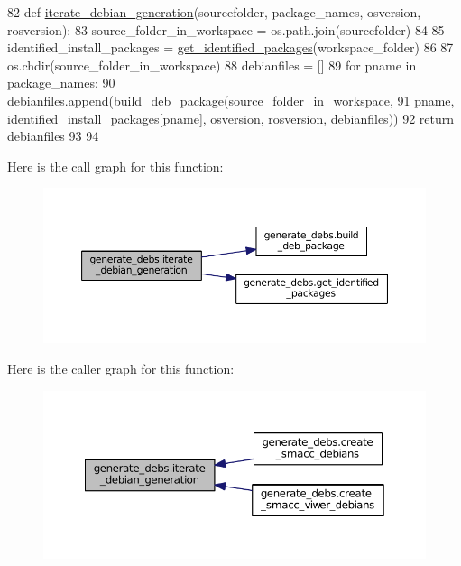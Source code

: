 \begin{DoxyCode}
82 \textcolor{keyword}{def }\hyperlink{namespacegenerate__debs_ad76fdfddc2dad3b2dc5b98239c6125d5}{iterate\_debian\_generation}(sourcefolder, package\_names, osversion, rosversion):
83     source\_folder\_in\_workspace = os.path.join(sourcefolder)
84 
85     identified\_install\_packages = \hyperlink{namespacegenerate__debs_aa91b87c6d9c3ed04015845cc9298431a}{get\_identified\_packages}(workspace\_folder)
86 
87     os.chdir(source\_folder\_in\_workspace)
88     debianfiles = []
89     \textcolor{keywordflow}{for} pname \textcolor{keywordflow}{in} package\_names:
90         debianfiles.append(\hyperlink{namespacegenerate__debs_aa70c3f4917ddc57b13eaed8501f571a8}{build\_deb\_package}(source\_folder\_in\_workspace,
91                                              pname, identified\_install\_packages[pname], osversion, 
      rosversion, debianfiles))
92     \textcolor{keywordflow}{return} debianfiles
93 
94 
\end{DoxyCode}


Here is the call graph for this function\+:
\nopagebreak
\begin{figure}[H]
\begin{center}
\leavevmode
\includegraphics[width=350pt]{namespacegenerate__debs_ad76fdfddc2dad3b2dc5b98239c6125d5_cgraph}
\end{center}
\end{figure}




Here is the caller graph for this function\+:
\nopagebreak
\begin{figure}[H]
\begin{center}
\leavevmode
\includegraphics[width=350pt]{namespacegenerate__debs_ad76fdfddc2dad3b2dc5b98239c6125d5_icgraph}
\end{center}
\end{figure}



